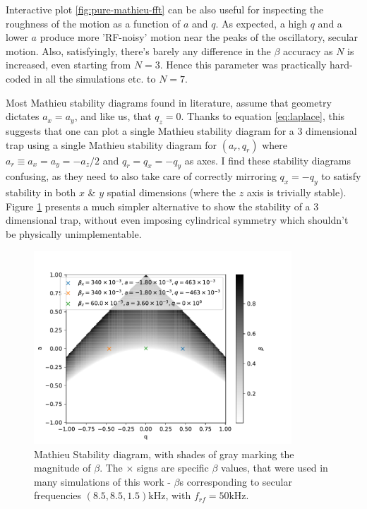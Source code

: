 Interactive plot \ref{fig:pure-mathieu-fft} can be also useful for inspecting the roughness of the motion as a function of $a$ and $q$. As expected, a high $q$ and a lower $a$ produce more 'RF-noisy' motion near the peaks of the oscillatory, secular motion. Also, satisfyingly, there's barely any difference in the $\beta$ accuracy as $N$ is increased, even starting from $N=3$. Hence this parameter was practically hard-coded in all the simulations etc. to $N=7$.

Most Mathieu stability diagrams found in literature, assume that geometry dictates $a_x = a_y$, and like us, that $q_z = 0$. Thanks to equation \ref{eq:laplace}, this suggests that one can plot a single Mathieu stability diagram for a 3 dimensional trap using a single Mathieu stability diagram for $(a_r,q_r)$ where $a_r \equiv a_x = a_y = -a_z/2$ and $q_r = q_x = -q_y$ as axes. I find these stability diagrams confusing, as they need to also take care of correctly mirroring $q_x = -q_y$ to satisfy stability in both $x$ \& $y$ spatial dimensions (where the $z$ axis is trivially stable). Figure \ref{fig:mathieu-stability} presents a much simpler alternative to show the stability of a 3 dimensional trap, without even imposing cylindrical symmetry which shouldn't be physically unimplementable.

\begin{figure}
	\begin{center}
		\includegraphics[width=0.86\textwidth]{graphics/pure-mathieu-stability.pdf}
	\end{center}
	\caption{Mathieu Stability diagram, with shades of gray marking the magnitude of $\beta$. The $\times$ signs are specific $\beta$ values, that were used in many simulations of this work - $\beta$s corresponding to secular frequencies $(8.5, 8.5, 1.5)\mathrm{kHz}$, with $f_{rf} = 50\mathrm{kHz}$.}
	\label{fig:mathieu-stability}
\end{figure}


